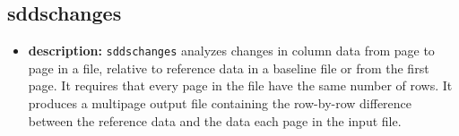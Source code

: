 \begin{latexonly}
\newpage
\end{latexonly}
\subsection{sddschanges}
\label{sddschanges}

\begin{itemize}
\item {\bf description:} {\tt sddschanges} analyzes changes in column data from page to page in a file,
relative to reference data in a baseline file or from the first page.  It requires that every page in the file have
the same number of rows.  It produces a multipage output file containing the row-by-row difference between the
reference data and the data each page in the input file.


\end{itemize}

